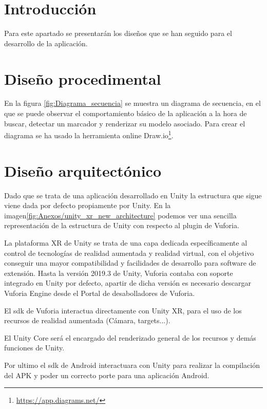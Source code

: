 
\section{Introducción}
 Para este apartado se presentarán los diseños que se han seguido para el desarrollo de la aplicación.
 

\section{Diseño procedimental}
En la figura  \ref{fig:Diagrama_secuencia} se muestra un diagrama de secuencia, en el que se puede observar el comportamiento básico de la aplicación a la hora de buscar, detectar un marcador y renderizar su modelo asociado. Para crear el diagrama se ha usado la herramienta online Draw.io\footnote{\url{https://app.diagrams.net/}}.



\section{Diseño arquitectónico}


Dado que se trata de una aplicación desarrollado en Unity la estructura que sigue viene dada por defecto propiamente por Unity. En la imagen\ref{fig:Anexos/unity_xr_new_architecture} podemos ver una sencilla representación de la estructura de Unity con respecto al plugin de Vuforia. 

La plataforma XR de Unity se trata de una capa dedicada específicamente al control de tecnologías de realidad aumentada y realidad virtual, con el objetivo conseguir una mayor compatibilidad y facilidades de desarrollo para software de extensión. Hasta la versión 2019.3 de Unity, Vuforia contaba con soporte integrado en Unity por defecto, apartir de dicha versión es necesario descargar Vuforia Engine desde el Portal de desabolladores de Vuforia. 

 
El sdk de Vuforia interactua directamente con Unity XR, para el uso de los recursos de realidad aumentada (Cámara, targets...). 

El Unity Core será el encargado del renderizado general de los recursos y demás funciones de Unity.

Por ultimo el sdk de Android interactuara con Unity para realizar la compilación del APK y poder un correcto porte para una aplicación Android.

